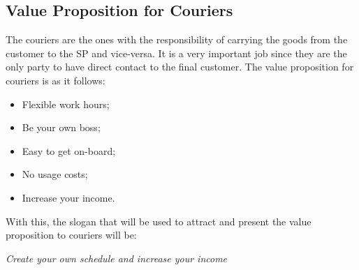 \subsection{Value Proposition for Couriers}
The couriers are the ones with the responsibility of carrying the goods from the customer to the \gls{SP} and vice-versa. It is a very important job since they are the only party to have direct contact to the final customer. The value proposition for couriers is as it follows:
\par
\begin{itemize}
    \item Flexible work hours;
    \item Be your own boss;
    \item Easy to get on-board;
    \item No usage costs;
    \item Increase your income.
\end{itemize}
\par
With this, the slogan that will be used to attract and present the value proposition to couriers will be:
\par
\textit{Create your own schedule and increase your income}

